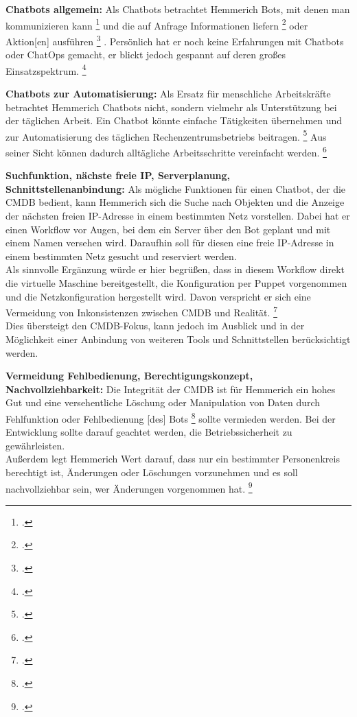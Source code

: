 \textbf{Chatbots allgemein: }Als Chatbots betrachtet Hemmerich Bots, \glqq{}mit denen man kommunizieren kann\grqq
\footcite[][o. \pno]{Hemm_2019}
und die auf Anfrage \glqq{}Informationen liefern\grqq
\footcite[][o. \pno]{Hemm_2019}
oder \glqq{}Aktion[en] ausführen\grqq
\footcite[][o. \pno]{Hemm_2019}
. Persönlich hat er noch keine Erfahrungen mit Chatbots oder ChatOps gemacht, er blickt jedoch gespannt auf deren großes Einsatzspektrum.
\footcite[Vgl.][o. \pno]{Hemm_2019}

\textbf{Chatbots zur Automatisierung: }Als Ersatz für menschliche Arbeitskräfte betrachtet Hemmerich Chatbots nicht, sondern vielmehr als Unterstützung bei der täglichen Arbeit. \glqq{}Ein Chatbot könnte einfache Tätigkeiten übernehmen und zur Automatisierung des täglichen Rechenzentrumsbetriebs beitragen.\grqq
\footcite[][o. \pno]{Hemm_2019}
Aus seiner Sicht können dadurch alltägliche Arbeitsschritte vereinfacht werden.
\footcite[Vgl.][o. \pno]{Hemm_2019}

\textbf{Suchfunktion, nächste freie IP, Serverplanung, Schnittstellenanbindung: }Als mögliche Funktionen für einen Chatbot, der die \acs{CMDB} bedient, kann Hemmerich sich die Suche nach Objekten und die Anzeige der nächsten freien IP-Adresse in einem bestimmten Netz vorstellen.
Dabei hat er einen Workflow vor Augen, bei dem ein Server über den Bot geplant und mit einem Namen versehen wird. Daraufhin soll für diesen eine freie IP-Adresse in einem bestimmten Netz gesucht und reserviert werden.\\
Als sinnvolle Ergänzung würde er hier begrüßen, dass in diesem Workflow direkt die virtuelle Maschine bereitgestellt, die Konfiguration per Puppet vorgenommen und die Netzkonfiguration hergestellt wird. Davon verspricht er sich eine Vermeidung von Inkonsistenzen zwischen CMDB und Realität. 
\footcite[Vgl.][o. \pno]{Hemm_2019}\\
Dies übersteigt den \acs{CMDB}-Fokus, kann jedoch im Ausblick und in der Möglichkeit einer Anbindung von weiteren Tools und Schnittstellen berücksichtigt werden.

\textbf{Vermeidung Fehlbedienung, Berechtigungskonzept, Nachvollziehbarkeit: }Die Integrität der \acs{CMDB} ist für Hemmerich ein hohes Gut und eine versehentliche Löschung oder Manipulation von Daten durch \glqq{}Fehlfunktion oder Fehlbedienung [des] Bots\grqq
\footcite[][o. \pno]{Hemm_2019}
sollte vermieden werden. Bei der Entwicklung sollte darauf geachtet werden, die Betriebssicherheit zu gewährleisten.\\
Außerdem legt Hemmerich Wert darauf, dass nur ein bestimmter Personenkreis berechtigt ist, Änderungen oder Löschungen vorzunehmen und es soll nachvollziehbar sein, wer Änderungen vorgenommen hat.
\footcite[Vgl.][o. \pno]{Hemm_2019}


